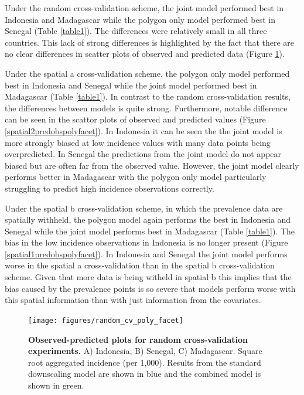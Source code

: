 \documentclass[10pt,letterpaper]{article}
\begin{document}

Under the random cross-validation scheme, the joint model performed best in Indonesia and Madagascar while the polygon only model performed best in Senegal (Table \ref{table1}).
The differences were relatively small in all three countries.
This lack of strong differences is highlighted by the fact that there are no clear differences in scatter plots of observed and predicted data (Figure \ref{randompredobspolyfacet}).
 



Under the spatial a cross-validation scheme, the polygon only model performed best in Indonesia and Senegal while the joint model performed best in Madagascar (Table \ref{table1}).
In contrast to the random cross-validation results, the differences between models is quite strong.
Furthermore, notable difference can be seen in the scattor plots of observed and predicted values (Figure \ref{spatial2predobspolyfacet}).
In Indonesia it can be seen the the joint model is more strongly biased at low incidence values with many data points being overpredicted.
In Senegal the predictions from the joint model do not appear biased but are often far from the observed value.
However, the joint model clearly performs better in Madagascar with the polygon only model particularly struggling to predict high incidence observations correctly.



Under the spatial b cross-validation scheme, in which the prevalence data are spatially withheld, the polygon model again performs the best in Indonesia and Senegal while the joint model performs best in Madagascar (Table \ref{table1}).
The bias in the low incidence observations in Indonesia is no longer present (Figure \ref{spatial1predobspolyfacet}).
In Indonesia and Senegal the joint model performs worse in the spatial a cross-validation than in the spatial b cross-validation scheme.
Given that more data is being witheld in spatial b this implies that the bias caused by the prevalence points is so severe that models perform worse with this spatial information than with just information from the covariates.

\begin{figure}
\texttt{[image: figures/random\_cv\_poly\_facet]}  
\caption{{\bf Observed-predicted plots for random cross-validation experiments.}
A) Indonesia, B) Senegal, C) Madagascar. Square root aggregated incidence (per 1,000).
Results from the standard downscaling model are shown in blue and the combined model is shown in green.
}
\label{randompredobspolyfacet}
\end{figure}
\end{document}
